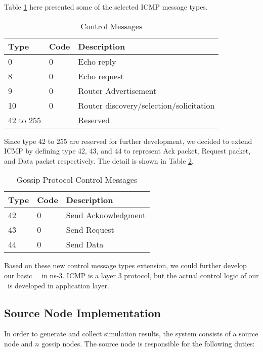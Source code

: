 Table \ref{table:2} here presented some of the selected ICMP message types. 

\begin{table}[h]
	\centering
	\caption{Control Messages}
	\label{table:2}
	\begin{tabular}{|p{1.5cm}|p{0.8 cm}|p{4.5 cm}|}
		\hline
		Type & Code & Description \\                                                           
		\hline
		0  & 0   & Echo reply   \\ \hline
		8  &  0 & Echo request \\ 
		\hline
		9 & 0 & Router Advertisement \\
		\hline
		10	& 0	&	Router discovery/selection/solicitation \\
		\hline
		42 to 255    &   & Reserved    \\ 
		\hline
	\end{tabular}
\end{table}

Since type 42 to 255 are reserved for further development, we decided to extend ICMP by defining type 42, 43, and 44 to represent Ack packet, Request packet, and Data packet respectively. The detail is shown in Table \ref{table:3}.

\begin{table}[h]
	\centering
	\caption{Gossip Protocol Control Messages}
	\label{table:3}
	\begin{tabular}{|p{0.8cm}|p{0.5 cm}|p{3.5 cm}|}
		\hline
		Type & Code & Description \\                                                           
		\hline
		42  & 0   & Send Acknowledgment   \\ \hline
		43  &  0 & Send Request \\ 
		\hline
		44 & 0 & Send Data \\
		\hline
	\end{tabular}
\end{table}

Based on these new control message types extension, we could further develop our basic \pp  ~\gp ~in ns-3. ICMP is a layer 3 protocol, but the actual control logic of our \gp ~is developed in application layer. 

\subsection{Source Node Implementation}
In order to generate and collect simulation results, the system consists of a source node and $n$ gossip nodes. The source node is responsible for the following duties:

